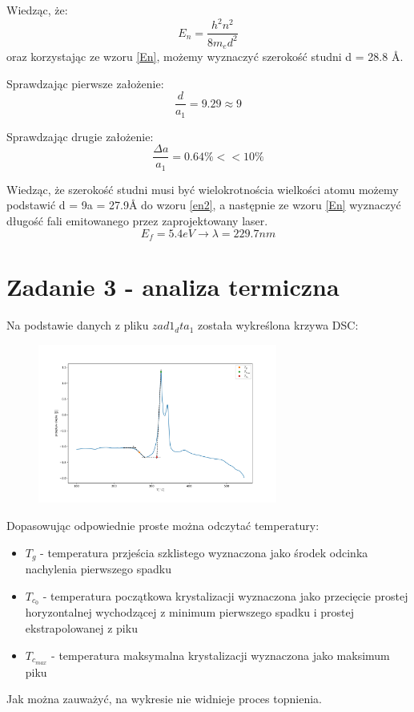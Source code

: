 \documentclass{article}
\begin{document}
Wiedząc, że: 
\begin{equation}\label{en2}
E_n = \frac{h^2n^2}{8m_ed^2}
\end{equation}
oraz korzystając ze wzoru \ref{En}, możemy wyznaczyć szerokość studni d = 28.8 \AA.

Sprawdzając pierwsze założenie:
$$ \frac{d}{a_1} = 9.29 \approx 9 $$

Sprawdzając drugie założenie:
$$ \frac{\Delta a}{a_1} = 0.64 \% << 10\%$$ 


Wiedząc, że szerokość studni musi być wielokrotnościa wielkości atomu możemy podstawić d = 9a = 27.9\AA $ $ do wzoru \ref{en2}, a następnie ze wzoru \ref{En} wyznaczyć długość fali emitowanego przez zaprojektowany laser.
$$E_f = 5.4 eV \rightarrow \lambda = 229.7 nm $$



\section*{Zadanie 3 - analiza termiczna}
Na podstawie danych z pliku $zad1_dta_1$ została wykreślona krzywa DSC:
\begin{figure}[H]
    \centering
    \includegraphics[width=0.7\textwidth]{zad3.jpg}
    \centering
\end{figure}
Dopasowując odpowiednie proste można odczytać temperatury:
\begin{itemize}
	\item $T_g$ - temperatura przjeścia szklistego wyznaczona jako środek odcinka nachylenia pierwszego spadku
	\item $T_{c_0}$ - temperatura początkowa krystalizacji wyznaczona jako przecięcie prostej horyzontalnej wychodzącej z minimum pierwszego spadku i prostej ekstrapolowanej z piku
	\item $T_{c_{max}}$ - temperatura maksymalna krystalizacji wyznaczona jako maksimum piku
\end{itemize}
Jak można zauważyć, na wykresie nie widnieje proces topnienia.
\end{document}
